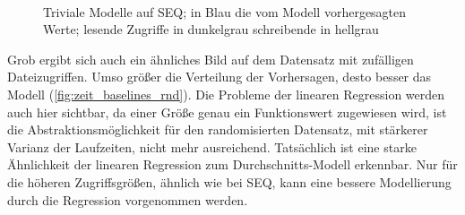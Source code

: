 \documentclass[
	12pt,
	a4paper,
	BCOR10mm,
	DIV14,
	listof=totoc,
	bibliography=totoc,
	headsepline
]{scrreprt}
\begin{document}
\begin{figure}
	\hfill
	\\
	\hfill
	\caption{Triviale Modelle auf SEQ; in Blau die vom Modell vorhergesagten Werte; lesende Zugriffe in dunkelgrau schreibende in hellgrau}
	\label{fig:zeit_baselines_seq}
\end{figure} 
Grob ergibt sich auch ein ähnliches Bild auf dem Datensatz mit zufälligen Dateizugriffen. Umso größer die Verteilung der Vorhersagen, desto besser das Modell  (\ref{fig:zeit_baselines_rnd}).
Die Probleme der linearen Regression werden auch hier sichtbar, da einer Größe genau ein Funktionswert zugewiesen wird, ist die Abstraktionsmöglichkeit für den randomisierten Datensatz, mit stärkerer Varianz der Laufzeiten, nicht mehr ausreichend.
Tatsächlich ist eine starke Ähnlichkeit der linearen Regression zum Durchschnitts-Modell erkennbar. Nur für die höheren Zugriffsgrößen, ähnlich wie bei SEQ, kann eine bessere Modellierung durch die Regression vorgenommen werden.
\end{document}
